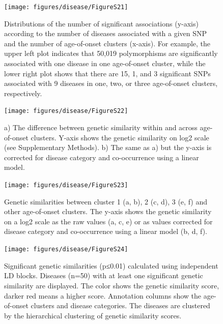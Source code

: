 \documentclass[12pt,twoside]{unicam}
\begin{document}
\begin{figure}

{\centering \texttt{[image: figures/disease/FigureS21]} 

}

\caption[Distributions of the number of significant associations according to the number of diseases associated with a given SNP and the number of age-of-onset clusters.]{Distributions of the number of significant associations (y-axis) according to the number of diseases associated with a given SNP and the number of age-of-onset clusters (x-axis). For example, the upper left plot indicates that 50,019 polymorphisms are significantly associated with one disease in one age-of-onset cluster, while the lower right plot shows that there are 15, 1, and 3 significant SNPs associated with 9 diseases in one, two, or three age-of-onset clusters, respectively.}\label{fig:disFigS21}
\end{figure}

\begin{figure}

{\centering \texttt{[image: figures/disease/FigureS22]} 

}

\caption[The difference between genetic similarity within and across age-of-onset clusters]{a) The difference between genetic similarity within and across age-of-onset clusters. Y-axis shows the genetic similarity on log2 scale (see Supplementary Methods). b) The same as a) but the y-axis is corrected for disease category and co-occurrence using a linear model. }\label{fig:disFigS22}
\end{figure}

\begin{figure}

{\centering \texttt{[image: figures/disease/FigureS23]} 

}

\caption[Genetic similarities between cluster 1, 2 , 3 and other age-of-onset clusters.]{Genetic similarities between cluster 1 (a, b), 2 (c, d), 3 (e, f) and other age-of-onset clusters. The y-axis shows the genetic similarity on a log2 scale as the raw values (a, c, e) or as values corrected for disease category and co-occurrence using a linear model (b, d, f).}\label{fig:disFigS23}
\end{figure}

\begin{figure}

{\centering \texttt{[image: figures/disease/FigureS24]} 

}

\caption[Significant genetic similarities calculated using independent LD blocks]{Significant genetic similarities (p≤0.01) calculated using independent LD blocks. Diseases (n=50) with at least one significant genetic similarity are displayed. The color shows the genetic similarity score, darker red means a higher score. Annotation columns show the age-of-onset clusters and disease categories. The diseases are clustered by the hierarchical clustering of genetic similarity scores.}\label{fig:disFigS24}
\end{figure}
\end{document}
